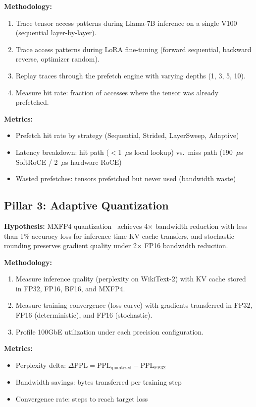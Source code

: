 \documentclass[11pt,letterpaper]{article}
\theoremstyle{definition}
\begin{document}
\textbf{Methodology:}
\begin{enumerate}
    \item Trace tensor access patterns during Llama-7B inference on a single V100 (sequential layer-by-layer).
    \item Trace access patterns during LoRA fine-tuning (forward sequential, backward reverse, optimizer random).
    \item Replay traces through the prefetch engine with varying depths (1, 3, 5, 10).
    \item Measure hit rate: fraction of accesses where the tensor was already prefetched.
\end{enumerate}

\textbf{Metrics:}
\begin{itemize}
    \item Prefetch hit rate by strategy (Sequential, Strided, LayerSweep, Adaptive)
    \item Latency breakdown: hit path ($<$1~$\mu$s local lookup) vs.\ miss path (190~$\mu$s SoftRoCE / 2~$\mu$s hardware RoCE)
    \item Wasted prefetches: tensors prefetched but never used (bandwidth waste)
\end{itemize}

\subsection{Pillar 3: Adaptive Quantization}

\textbf{Hypothesis:} MXFP4 quantization~\cite{rouhani2023mxfp4} achieves 4$\times$ bandwidth reduction with less than 1\% accuracy loss for inference-time KV cache transfers, and stochastic rounding preserves gradient quality under 2$\times$ FP16 bandwidth reduction.

\textbf{Methodology:}
\begin{enumerate}
    \item Measure inference quality (perplexity on WikiText-2) with KV cache stored in FP32, FP16, BF16, and MXFP4.
    \item Measure training convergence (loss curve) with gradients transferred in FP32, FP16 (deterministic), and FP16 (stochastic).
    \item Profile 100GbE utilization under each precision configuration.
\end{enumerate}

\textbf{Metrics:}
\begin{itemize}
    \item Perplexity delta: $\Delta \text{PPL} = \text{PPL}_{\text{quantized}} - \text{PPL}_{\text{FP32}}$
    \item Bandwidth savings: bytes transferred per training step
    \item Convergence rate: steps to reach target loss
\end{itemize}
\end{document}
